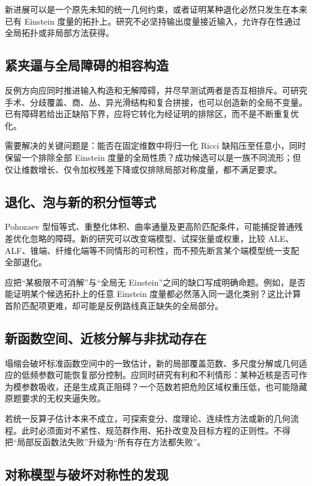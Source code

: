 \documentclass[11pt,a4paper]{article}
\theoremstyle{definition}
\begin{document}
新进展可以是一个原先未知的统一几何约束，或者证明某种退化必然只发生在本来已有 Einstein 度量的拓扑上。研究不必坚持输出度量接近输入，允许存在性通过全局拓扑或非局部方法获得。

\subsection{紧夹逼与全局障碍的相容构造}

反例方向应同时推进输入构造和无解障碍，并尽早测试两者是否互相排斥。可研究手术、分歧覆盖、商、丛、异光滑结构和复合拼接，也可以创造新的全局不变量。已有障碍若给出正缺陷下界，应将它转化为经证明的排除区，而不是不断重复优化。

需要解决的关键问题是：能否在固定维数中将归一化 Ricci 缺陷压至任意小，同时保留一个排除全部 Einstein 度量的全局性质？成功候选可以是一族不同流形；但仅让维数增长、仅令加权残差下降或仅排除局部对称度量，都不满足要求。

\subsection{退化、泡与新的积分恒等式}

Pohozaev 型恒等式、重整化体积、曲率通量及更高阶匹配条件，可能捕捉普通残差优化忽略的障碍。新的研究可以改变端模型、试探张量或权重，比较 ALE、ALF、锥端、纤维化端等不同情形的可积性，而不预先断言某个端模型统一支配全部退化。

应把“某极限不可消解”与“全局无 Einstein”之间的缺口写成明确命题。例如，是否能证明某个候选拓扑上的任意 Einstein 度量都必然落入同一退化类别？这比计算首阶匹配项更难，却可能是反例路线真正缺失的全局部分。

\subsection{新函数空间、近核分解与非扰动存在}

塌缩会破坏标准函数空间中的一致估计，新的局部覆盖范数、多尺度分解或几何适应的低频参数可能恢复部分控制。应同时研究有利和不利情形：某种近核是否可作为模参数吸收，还是生成真正阻碍？一个范数若把危险区域权重压低，也可能隐藏原题要求的无权夹逼失败。

若统一反算子估计本来不成立，可探索变分、度理论、连续性方法或新的几何流程。此时必须面对不紧性、规范群作用、拓扑改变及目标方程的正则性。不得把“局部反函数法失败”升级为“所有存在方法都失败”。

\subsection{对称模型与破坏对称性的发现}
\end{document}
